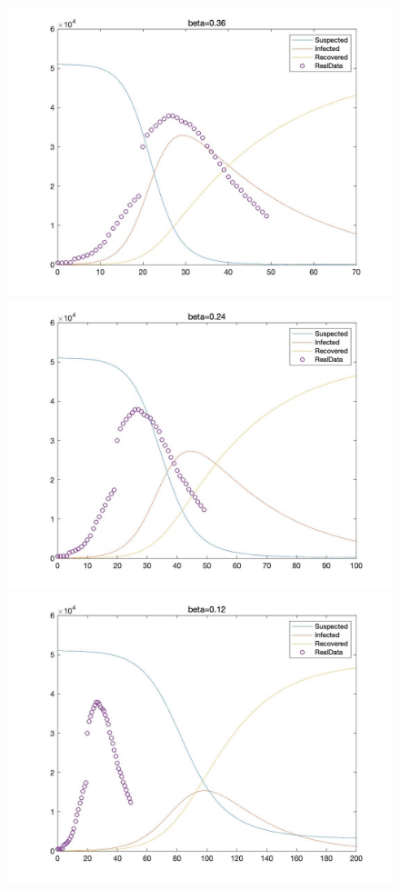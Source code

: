\documentclass[UTF8]{ctexart}
\begin{document}
			\begin{figure}[H]
				\centering
				\includegraphics[scale=0.15]{beta4.jpg}
				\qquad
				\includegraphics[scale=0.15]{beta3.jpg} \\
				\includegraphics[scale=0.15]{beta2}

\end{figure}
\end{document}
